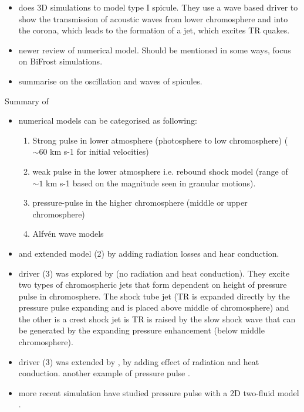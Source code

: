 \documentclass[12pt]{ociamthesis}
\newcommand{\Alfven}{Alfv\'{e}n }
\begin{document}
\begin{itemize}
\item \cite{Scullion2011ApJ74314S} does 3D simulations to model type I spicule. They use a wave based driver to show the transmission of acoustic waves from lower chromosphere and into the corona, which leads to the formation of a jet, which excites TR quakes.       
\item \cite{Carlsson2019ARAA57189C} newer review of numerical model. Should be mentioned in some ways, focus on BiFrost simulations.
\item \cite{Zaqarashvili_2009SSRv} summarise on the oscillation and waves of spicules.
\end{itemize}
Summary of \cite{Sterling_2000SoPh}
\begin{itemize}
\item numerical models can be categorised as following: 
\begin{enumerate}
\item Strong pulse in lower atmosphere (photosphere to low chromosphere) ($\sim 60$ km s-1 for initial velocities)
\item weak pulse in the lower atmosphere i.e. rebound shock model (range of $\sim 1$ km s-1 based on the magnitude seen in granular motions). 
\item pressure-pulse in the higher chromosphere (middle or upper chromosphere)
\item \Alfven wave models 
\end{enumerate}
\item \cite{Sterling1990ApJ349647S} and \cite{Cheng1992AA266537C} extended model (2) by adding radiation losses and hear conduction. 
\item driver (3) was explored by \cite{Shibata1982} (no radiation and heat conduction). They excite two types of chromospheric jets that form dependent on height of pressure pulse in chromosphere. The shock tube jet (TR is expanded directly by the pressure pulse expanding and is placed above middle of chromosphere) and the other is a crest shock jet is TR is raised by the slow shock wave that can be generated by the expanding pressure enhancement (below middle chromosphere). 
\item driver (3) was extended by \cite{Sterling1990ApJ349647S,Sterling1993ApJ407778S,Cheng1992AA266537C,Heggland2007ApJ6661277H,kuzma2017AA597A133K}, by adding effect of radiation and heat conduction. another example of pressure pulse \cite{Smirnova2016SoPh2913207S}. 
\item more recent simulation have studied pressure pulse with a 2D two-fluid model \cite{kuzma2017ApJ84978K}.   

\end{itemize}
\end{document}
